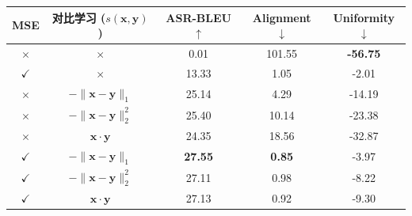 \begin{table}[!htbp]
    \label{tab:comspeech_objectives}
    \centering
    \small
    \begin{tabular}{ccccc}
        \toprule
        \textbf{MSE} & \textbf{对比学习} ($s(\mathbf{x}, \mathbf{y})$) & \textbf{ASR-BLEU$\uparrow$} & \textbf{Alignment$\downarrow$} & \textbf{Uniformity$\downarrow$} \\
        \midrule
        $\times$ & $\times$ & 0.01 & 101.55 & \textbf{-56.75} \\
        $\checkmark$ & $\times$ & 13.33 & 1.05 & -2.01 \\
        $\times$ & $-\|\mathbf{x} - \mathbf{y}\|_1$ & 25.14 & 4.29 & -14.19 \\
        $\times$ & $-\|\mathbf{x} - \mathbf{y}\|_2^2$ & 25.40 & 10.14 & -23.38 \\
        $\times$ & $\mathbf{x}\cdot\mathbf{y}$ & 24.35 & 18.56 & -32.87 \\
        $\checkmark$ & $-\|\mathbf{x} - \mathbf{y}\|_1$ & \textbf{27.55} & \textbf{0.85} & -3.97 \\
        $\checkmark$ & $-\|\mathbf{x} - \mathbf{y}\|_2^2$ & 27.11 & 0.98 & -8.22 \\
        $\checkmark$ & $\mathbf{x}\cdot\mathbf{y}$ & 27.13 & 0.92 & -9.30 \\
        \bottomrule
    \end{tabular}
\end{table}

